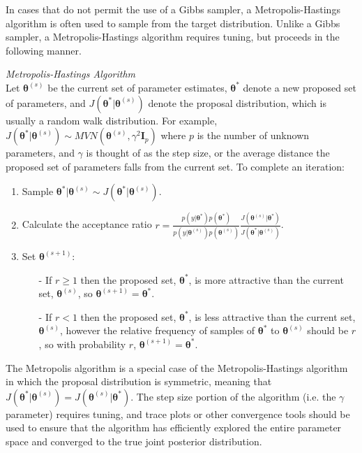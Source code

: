 \documentclass[12pt]{article}\usepackage[]{graphicx}\usepackage[]{color}
\begin{document}
In cases that do not permit the use of a Gibbs sampler, a Metropolis-Hastings algorithm is often used to sample from the target distribution. Unlike a Gibbs sampler, a Metropolis-Hastings algorithm requires tuning, but proceeds in the following manner. 

\begin{mdframed}
\textit{Metropolis-Hastings Algorithm} \\
Let $\bm{\theta}^{(s)}$ be the current set of parameter estimates, $\bm{\theta}^*$ denote a new proposed set of parameters, and $J(\bm{\theta}^*|\bm{\theta}^{(s)})$ denote the proposal distribution, which is usually a random walk distribution. For example, $J(\bm{\theta}^*|\bm{\theta}^{(s)}) \sim MVN(\bm{\theta}^{(s)}, \gamma^2 \bm{I}_p)$ where $p$ is the number of unknown parameters, and $\gamma$ is thought of as the step size, or the average distance the proposed set of parameters falls from the current set. To complete an iteration: 
\begin{enumerate}
\item Sample $\bm{\theta}^*|\bm{\theta}^{(s)} \sim J(\bm{\theta}^*|\bm{\theta}^{(s)})$. 
\item Calculate the acceptance ratio $r = \frac{p(y|\bm{\theta}^*)p(\bm{\theta}^*)}{p(y|\bm{\theta}^{(s)})p(\bm{\theta}^{(s)})} \frac{J(\bm\theta^{(s)}|\bm\theta^*)}{J(\bm\theta^*|\bm\theta^{(s)})}$. 
\item Set $\bm{\theta}^{(s+1)}$:
\begin{itemize}
\item[-] If $r \geq 1$ then the proposed set, $\bm{\theta}^*$, is more attractive than the current set, $\bm{\theta}^{(s)}$, so $\bm{\theta}^{(s+1)} =   \bm{\theta}^*$. 
\item[-] If $r < 1$ then the proposed set, $\bm{\theta}^*$, is less attractive than the current set, $\bm{\theta}^{(s)}$, however the relative frequency of samples of $\bm{\theta}^*$ to $\bm{\theta}^{(s)}$ should be $r$, so with probability $r$, $\bm{\theta}^{(s+1)} = \bm{\theta}^*$.
\end{itemize}
\end{enumerate}
\end{mdframed}
  
\noindent The Metropolis algorithm is a special case of the Metropolis-Hastings algorithm in which the proposal distribution is symmetric, meaning that $J(\bm{\theta}^*|\bm{\theta}^{(s)}) = J(\bm{\theta}^{(s)}|\bm{\theta}^*)$. The step size portion of the algorithm (i.e. the $\gamma$ parameter) requires tuning, and trace plots or other convergence tools should be used to ensure that the algorithm has efficiently explored the entire parameter space and converged to the true joint posterior distribution. 
\end{document}
